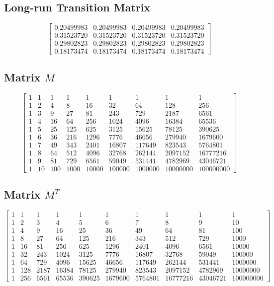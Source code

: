 \documentclass{article}
\begin{document}
\subsection*{Long-run Transition Matrix}
\[
\begin{bmatrix}
0.20499983 & 0.20499983 & 0.20499983 & 0.20499983 \\
0.31523720 & 0.31523720 & 0.31523720 & 0.31523720 \\
0.29802823 & 0.29802823 & 0.29802823 & 0.29802823 \\
0.18173474 & 0.18173474 & 0.18173474 & 0.18173474
\end{bmatrix}
\]

\subsection*{Matrix \(M\)}
\[
\begin{bmatrix}
1   & 1   & 1   & 1   & 1   & 1   & 1   & 1   & 1 \\
1   & 2   & 4   & 8   & 16  & 32  & 64  & 128 & 256 \\
1   & 3   & 9   & 27  & 81  & 243 & 729 & 2187 & 6561 \\
1   & 4   & 16  & 64  & 256 & 1024 & 4096 & 16384 & 65536 \\
1   & 5   & 25  & 125 & 625 & 3125 & 15625 & 78125 & 390625 \\
1   & 6   & 36  & 216 & 1296& 7776 & 46656 & 279940 & 1679600 \\
1   & 7   & 49  & 343 & 2401& 16807& 117649& 823543& 5764801 \\
1   & 8   & 64  & 512 & 4096& 32768& 262144& 2097152& 16777216 \\
1   & 9   & 81  & 729 & 6561& 59049& 531441& 4782969& 43046721 \\
1   & 10  & 100 & 1000& 10000& 100000& 1000000& 10000000& 100000000
\end{bmatrix}
\]

\subsection*{Matrix \(M^T\)}
\[
\begin{bmatrix}
1   & 1   & 1   & 1   & 1   & 1   & 1   & 1   & 1   & 1 \\
1   & 2   & 3   & 4   & 5   & 6   & 7   & 8   & 9   & 10 \\
1   & 4   & 9   & 16  & 25  & 36  & 49  & 64  & 81  & 100 \\
1   & 8   & 27  & 64  & 125 & 216 & 343 & 512 & 729 & 1000 \\
1   & 16  & 81  & 256 & 625 & 1296& 2401& 4096& 6561& 10000 \\
1   & 32  & 243 & 1024& 3125& 7776& 16807& 32768& 59049& 100000 \\
1   & 64  & 729 & 4096& 15625& 46656& 117649& 262144& 531441& 1000000 \\
1   & 128 & 2187& 16384& 78125& 279940& 823543& 2097152& 4782969& 10000000 \\
1   & 256 & 6561& 65536& 390625& 1679600& 5764801& 16777216& 43046721& 100000000
\end{bmatrix}
\]
\end{document}
